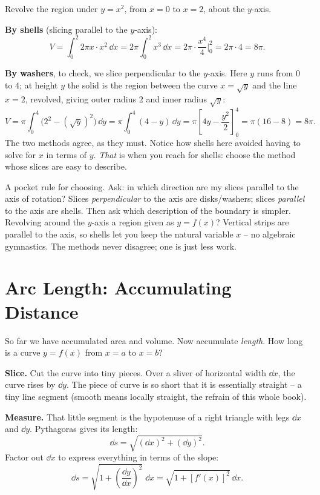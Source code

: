 \begin{example}
\label{ch26:ex-shell-check}
Revolve the region under $y = x^2$, from $x=0$ to $x=2$, about the $y$-axis.

\textbf{By shells} (slicing parallel to the $y$-axis):
\[
  V = \int_0^2 2\pi x\cdot x^2\,\dd x = 2\pi\int_0^2 x^3\,\dd x
    = 2\pi\cdot\frac{x^4}{4}\Big|_0^2 = 2\pi\cdot 4 = 8\pi.
\]

\textbf{By washers}, to check, we slice perpendicular to the $y$-axis. Here $y$
runs from $0$ to $4$; at height $y$ the solid is the region between the curve
$x=\sqrt{y}$ and the line $x=2$, revolved, giving outer radius $2$ and inner
radius $\sqrt{y}$:
\[
  V = \pi\int_0^4\bigl(2^2 - (\sqrt y)^2\bigr)\,\dd y
    = \pi\int_0^4 (4 - y)\,\dd y
    = \pi\left[4y - \frac{y^2}{2}\right]_0^4
    = \pi(16-8) = 8\pi.
\]
The two methods agree, as they must. Notice how shells here avoided having to
solve for $x$ in terms of $y$. \emph{That} is when you reach for shells: choose
the method whose slices are easy to describe.
\end{example}

\begin{intuitionbox}
A pocket rule for choosing. Ask: in which direction are my slices parallel to the
axis of rotation? Slices \emph{perpendicular} to the axis are disks/washers; slices
\emph{parallel} to the axis are shells. Then ask which description of the boundary
is simpler. Revolving around the $y$-axis a region given as $y=f(x)$? Vertical
strips are parallel to the axis, so shells let you keep the natural variable $x$ --
no algebraic gymnastics. The methods never disagree; one is just less work.
\end{intuitionbox}

\section{Arc Length: Accumulating Distance}
\label{ch26:arclength}

So far we have accumulated area and volume. Now accumulate \emph{length}. How long
is a curve $y=f(x)$ from $x=a$ to $x=b$?

\textbf{Slice.} Cut the curve into tiny pieces. Over a sliver of horizontal width
$\dd x$, the curve rises by $\dd y$. The piece of curve is so short that it is
essentially straight -- a tiny line segment (smooth means locally straight, the
refrain of this whole book).

\textbf{Measure.} That little segment is the hypotenuse of a right triangle with
legs $\dd x$ and $\dd y$. Pythagoras gives its length:
\[
  \dd s = \sqrt{(\dd x)^2 + (\dd y)^2}.
\]
Factor out $\dd x$ to express everything in terms of the slope:
\[
  \dd s = \sqrt{1 + \left(\frac{\dd y}{\dd x}\right)^2}\;\dd x
        = \sqrt{1 + [f'(x)]^2}\,\dd x.
\]

